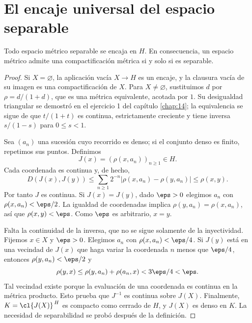 \section{El encaje universal del espacio separable}
\begin{teorema}\label{ch16:encaje}
Todo espacio métrico separable se encaja en $H$. En consecuencia, un espacio métrico admite una compactificación métrica si y solo si es separable.
\end{teorema}
\begin{proof}
Si $X=\varnothing$, la aplicación vacía $X\to H$ es un encaje, y la clausura vacía de su imagen es una compactificación de $X$. Para $X\ne\varnothing$, sustituimos $d$ por $\rho=d/(1+d)$, que es una métrica equivalente, acotada por $1$. Su desigualdad triangular se demostró en el ejercicio 1 del capítulo \ref{chap:14}; la equivalencia se sigue de que $t/(1+t)$ es continua, estrictamente creciente y tiene inversa $s/(1-s)$ para $0\le s<1$.

Sea $(a_n)$ una sucesión cuyo recorrido es denso; si el conjunto denso es finito, repetimos sus puntos. Definimos
\[
J(x)=(\rho(x,a_n))_{n\ge1}\in H.
\]
Cada coordenada es continua y, de hecho,
\[
D(J(x),J(y))\le\sum_{n\ge1}2^{-n}|\rho(x,a_n)-\rho(y,a_n)|\le\rho(x,y).
\]
Por tanto $J$ es continua. Si $J(x)=J(y)$, dado $\eps>0$ elegimos $a_n$ con $\rho(x,a_n)<\eps/2$. La igualdad de coordenadas implica $\rho(y,a_n)=\rho(x,a_n)$, así que $\rho(x,y)<\eps$. Como $\eps$ es arbitrario, $x=y$.

Falta la continuidad de la inversa, que no se sigue solamente de la inyectividad. Fijemos $x\in X$ y $\eps>0$. Elegimos $a_n$ con $\rho(x,a_n)<\eps/4$. Si $J(y)$ está en una vecindad de $J(x)$ que haga variar la coordenada $n$ menos que $\eps/4$, entonces $\rho(y,a_n)<\eps/2$ y
\[
\rho(y,x)\le\rho(y,a_n)+\rho(a_n,x)<3\eps/4<\eps.
\]
Tal vecindad existe porque la evaluación de una coordenada es continua en la métrica producto. Esto prueba que $J^{-1}$ es continua sobre $J(X)$. Finalmente, $K=\cl{J(X)}^{\,H}$ es compacto como cerrado de $H$, y $J(X)$ es denso en $K$. La necesidad de separabilidad se probó después de la definición.
\end{proof}

